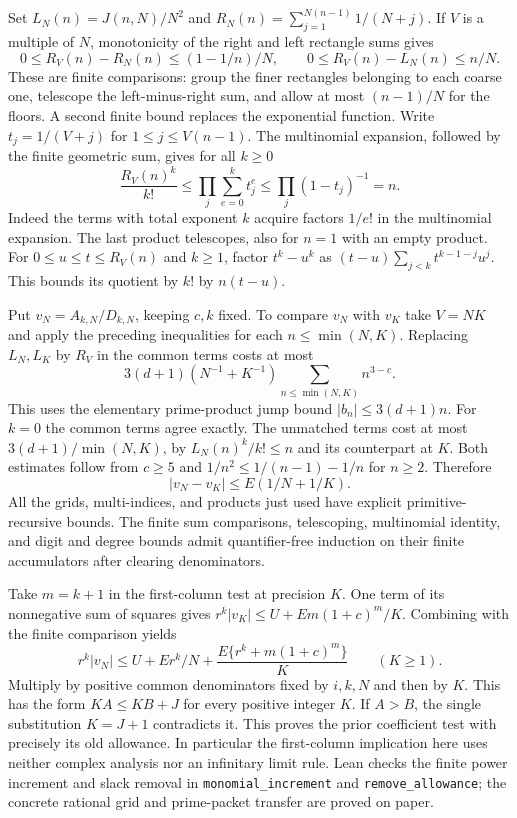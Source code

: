 Set $L_N(n)=J(n,N)/N^2$ and $R_N(n)=\sum_{j=1}^{N(n-1)}1/(N+j)$. If $V$ is a multiple of $N$, monotonicity of the right and left rectangle sums gives
\[
  0\le R_V(n)-R_N(n)\le (1-1/n)/N,\qquad
  0\le R_V(n)-L_N(n)\le n/N.
\]
These are finite comparisons: group the finer rectangles belonging to each coarse one, telescope the left-minus-right sum, and allow at most $(n-1)/N$ for the floors. A second finite bound replaces the exponential function. Write $t_j=1/(V+j)$ for $1\le j\le V(n-1)$. The multinomial expansion, followed by the finite geometric sum, gives for all $k\ge0$
\[
 \frac{R_V(n)^k}{k!}\le \prod_j\sum_{e=0}^k t_j^e
 \le \prod_j(1-t_j)^{-1}=n.
\]
Indeed the terms with total exponent $k$ acquire factors $1/e!$ in the multinomial expansion. The last product telescopes, also for $n=1$ with an empty product. For $0\le u\le t\le R_V(n)$ and $k\ge1$, factor $t^k-u^k$ as $(t-u)\sum_{j<k}t^{k-1-j}u^j$. This bounds its quotient by $k!$ by $n(t-u)$.

Put $v_N=A_{k,N}/D_{k,N}$, keeping $c,k$ fixed. To compare $v_N$ with $v_K$ take $V=NK$ and apply the preceding inequalities for each $n\le\min(N,K)$. Replacing $L_N,L_K$ by $R_V$ in the common terms costs at most
\[
  3(d+1)(N^{-1}+K^{-1})\sum_{n\le\min(N,K)}n^{3-c}.
\]
This uses the elementary prime-product jump bound $|b_n|\le3(d+1)n$. For $k=0$ the common terms agree exactly. The unmatched terms cost at most $3(d+1)/\min(N,K)$, by $L_N(n)^k/k!\le n$ and its counterpart at $K$. Both estimates follow from $c\ge5$ and $1/n^2\le1/(n-1)-1/n$ for $n\ge2$. Therefore
\[
  |v_N-v_K|\le E(1/N+1/K).
\]
All the grids, multi-indices, and products just used have explicit primitive-recursive bounds. The finite sum comparisons, telescoping, multinomial identity, and digit and degree bounds admit quantifier-free induction on their finite accumulators after clearing denominators.

Take $m=k+1$ in the first-column test at precision $K$. One term of its nonnegative sum of squares gives $r^k|v_K|\le U+Em(1+c)^m/K$. Combining with the finite comparison yields
\[
 r^k|v_N|\le U+Er^k/N+\frac{E\{r^k+m(1+c)^m\}}{K}
 \qquad(K\ge1).
\]
Multiply by positive common denominators fixed by $i,k,N$ and then by $K$. This has the form $KA\le KB+J$ for every positive integer $K$. If $A>B$, the single substitution $K=J+1$ contradicts it. This proves the prior coefficient test with precisely its old allowance. In particular the first-column implication here uses neither complex analysis nor an infinitary limit rule. Lean checks the finite power increment and slack removal in \texttt{monomial\_increment} and \texttt{remove\_allowance}; the concrete rational grid and prime-packet transfer are proved on paper.

